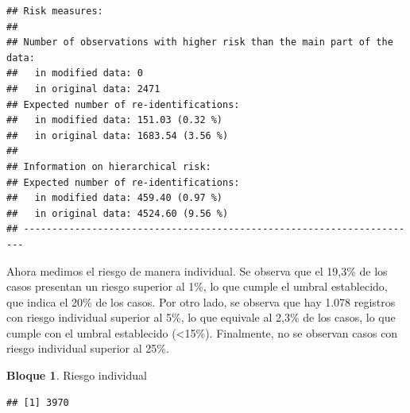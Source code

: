 \documentclass[]{book}
\newenvironment{Shaded}{\begin{snugshade}}{\end{snugshade}}
\newcommand{\CommentTok}[1]{\textcolor[rgb]{0.56,0.35,0.01}{\textit{#1}}}
\newcommand{\FloatTok}[1]{\textcolor[rgb]{0.00,0.00,0.81}{#1}}
\newcommand{\KeywordTok}[1]{\textcolor[rgb]{0.13,0.29,0.53}{\textbf{#1}}}
\newcommand{\NormalTok}[1]{#1}
\newcommand{\OperatorTok}[1]{\textcolor[rgb]{0.81,0.36,0.00}{\textbf{#1}}}
\newcommand{\StringTok}[1]{\textcolor[rgb]{0.31,0.60,0.02}{#1}}
\theoremstyle{definition}
\theoremstyle{definition}
\newtheorem{example}{Bloque}[chapter]
\theoremstyle{definition}
\theoremstyle{definition}
\theoremstyle{remark}
\begin{document}
\begin{verbatim}
## Risk measures:
## 
## Number of observations with higher risk than the main part of the data: 
##   in modified data: 0
##   in original data: 2471
## Expected number of re-identifications: 
##   in modified data: 151.03 (0.32 %)
##   in original data: 1683.54 (3.56 %)
## 
## Information on hierarchical risk:
## Expected number of re-identifications: 
##   in modified data: 459.40 (0.97 %)
##   in original data: 4524.60 (9.56 %)
## ----------------------------------------------------------------------
\end{verbatim}

Ahora medimos el riesgo de manera individual. Se observa que el 19,3\% de los casos presentan un riesgo superior al 1\%, lo que cumple el umbral establecido, que indica el 20\% de los casos. Por otro lado, se observa que hay 1.078 registros con riesgo individual superior al 5\%, lo que equivale al 2,3\% de los casos, lo que cumple con el umbral establecido (\textless{}15\%). Finalmente, no se observan casos con riesgo individual superior al 25\%.

\begin{example}
\protect\hypertarget{exm:bloque67nbm}{}{\label{exm:bloque67nbm} }Riesgo individual
\end{example}

\begin{Shaded}
\end{Shaded}

\begin{verbatim}
## [1] 3970
\end{verbatim}

\begin{Shaded}
\end{Shaded}
\end{document}
